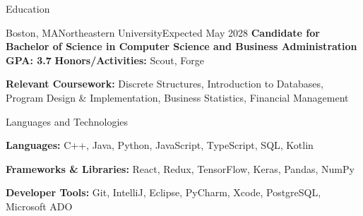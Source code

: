 \documentclass[]{mcdowellcv}
\begin{document}
	\makeheader
	\begin{cvsection}{Education}
		\begin{cvsubsection}{ Boston, MA}{Northeastern University}{Expected May 2028}
		\textbf{Candidate for Bachelor of Science in Computer Science and Business Administration \hfill{GPA: 3.7}}
		\textbf{Honors/Activities:} Scout, Forge
		\vspace{-2mm}
			
		\textbf{Relevant Coursework:} Discrete Structures, Introduction to Databases, Program Design \& Implementation, Business Statistics, Financial Management
		\end{cvsubsection}
	\end{cvsection}
		\begin{cvsection}{Languages and Technologies}
		\begin{cvsubsection}{}{}{}	

\textbf{Languages:} C++, Java, Python, JavaScript, TypeScript, SQL, Kotlin
\vspace{-2mm}

\textbf{Frameworks \& Libraries:} React, Redux, TensorFlow, Keras, Pandas, NumPy
\vspace{-2mm}

\textbf{Developer Tools:} Git, IntelliJ, Eclipse, PyCharm, Xcode, PostgreSQL, Microsoft ADO
		\end{cvsubsection}
	\end{cvsection}
\end{document}
